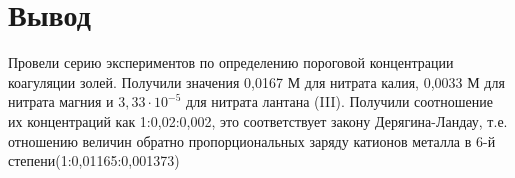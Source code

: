 \documentclass[a4paper, 12pt]{article}
\begin{document}
\newpage
\section{Вывод}
Провели серию экспериментов по определению пороговой концентрации коагуляции золей. Получили значения 0,0167 М для нитрата калия, 0,0033 М для нитрата магния и $3,33\cdot10^{-5}$ для нитрата лантана (III). Получили соотношение их концентраций как 1:0,02:0,002, это соответствует закону Дерягина-Ландау, т.е. отношению величин обратно пропорциональных заряду катионов металла в 6-й степени(1:0,01165:0,001373)
\end{document}
